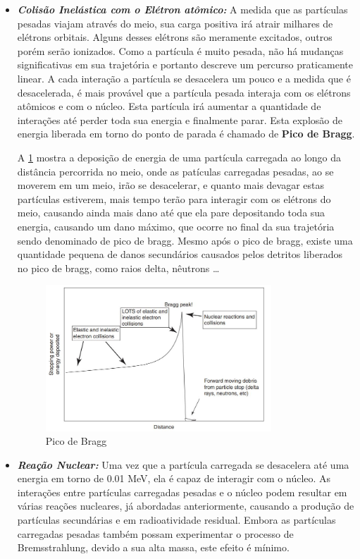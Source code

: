\documentclass[11pt,a4paper]{article}
\begin{document}
    \begin{itemize}
		\item \textbf{\textit{\textcolor{CarnationPink}{Colisão Inelástica com o Elétron atômico}:}} A medida que as partículas pesadas viajam através do meio, sua carga positiva irá atrair milhares de elétrons orbitais. Alguns desses elétrons são meramente excitados, outros porém serão ionizados. Como a partícula é muito pesada, não há mudanças significativas em sua trajetória e portanto descreve um percurso praticamente linear. A cada interação a partícula se desacelera um pouco e a medida que é desacelerada, é mais provável que a partícula pesada interaja com os elétrons atômicos e com o núcleo. Esta partícula irá aumentar a quantidade de interações até perder toda sua energia e finalmente parar. Esta explosão de energia liberada em torno do ponto de parada é chamado de \textbf{\textcolor{CarnationPink}{Pico de Bragg}}.
		
		A \ref{fig:picodeBragg} mostra a deposição de energia de uma partícula carregada ao longo da distância percorrida no meio, onde as patículas carregadas pesadas, ao se moverem em um meio, irão se desacelerar, e quanto mais devagar estas partículas estiverem, mais tempo terão para interagir com os elétrons do meio, causando ainda mais dano até que ela pare depositando toda sua energia, causando um dano máximo, que ocorre no final da sua trajetória sendo denominado de pico de bragg. Mesmo após o pico de bragg, existe uma quantidade pequena de danos secundários causados pelos detritos liberados no pico de bragg, como raios delta, nêutrons \dots
		
		\begin{figure}[h]
			\centering
			\includegraphics[width=0.8\textwidth]{Imagens/picodeBragg.JPG}
			\caption{Pico de Bragg}
			\label{fig:picodeBragg}                
		\end{figure}
		

		\item \textbf{\textit{\textcolor{CarnationPink}{Reação Nuclear}:}} Uma vez que a partícula carregada se desacelera até uma energia em torno de 0.01 MeV, ela é capaz de interagir com o núcleo. As interações entre partículas carregadas pesadas e o núcleo podem resultar em várias reações nucleares, já abordadas anteriormente, causando a produção de partículas secundárias e em radioatividade residual. Embora as partículas carregadas pesadas também possam experimentar o processo de Bremsstrahlung, devido a sua alta massa, este efeito é mínimo.  
	\end{itemize}        
\end{document}
